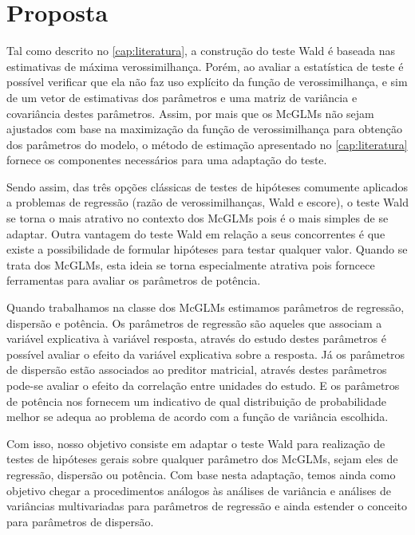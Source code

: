 
\chapter{Proposta}

\label{cap:proposta}

Tal como descrito no \autoref{cap:literatura}, a construção do teste Wald é baseada nas estimativas de máxima verossimilhança. Porém, ao avaliar a estatística de teste é possível verificar que ela não faz uso explícito da função de verossimilhança, e sim de um vetor de estimativas dos parâmetros e uma matriz de variância e covariância destes parâmetros. Assim, por mais que os McGLMs não sejam ajustados com base na maximização da função de verossimilhança para obtenção dos parâmetros do modelo, o método de estimação apresentado no \autoref{cap:literatura} fornece os componentes necessários para uma adaptação do teste. 

Sendo assim, das três opções clássicas de testes de hipóteses comumente aplicados a problemas de regressão (razão de verossimilhanças, Wald e escore), o teste Wald se torna o mais atrativo no contexto dos McGLMs pois é o mais simples de se adaptar. Outra vantagem do teste Wald em relação a seus concorrentes é que existe a possibilidade de formular hipóteses para testar qualquer valor. Quando se trata dos McGLMs, esta ideia se torna especialmente atrativa pois forncece ferramentas para avaliar os parâmetros de potência.

Quando trabalhamos na classe dos McGLMs estimamos parâmetros de regressão, dispersão e potência. Os parâmetros de regressão são aqueles que associam a variável explicativa à variável resposta, através do estudo destes parâmetros é possível avaliar o efeito da variável explicativa sobre a resposta. Já os parâmetros de dispersão estão associados ao preditor matricial, através destes parâmetros pode-se avaliar o efeito da correlação entre unidades do estudo. E os parâmetros de potência nos fornecem um indicativo de qual distribuição de probabilidade melhor se adequa ao problema de acordo com a função de variância escolhida. 

Com isso, nosso objetivo consiste em adaptar o teste Wald para realização de testes de hipóteses gerais sobre qualquer parâmetro dos McGLMs, sejam eles de regressão, dispersão ou potência. Com base nesta adaptação, temos ainda como objetivo chegar a procedimentos análogos às análises de variância e análises de variâncias multivariadas para parâmetros de regressão e ainda estender o conceito para parâmetros de dispersão. 

